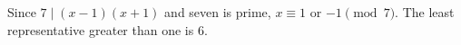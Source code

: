 Since $7\mid(x-1)(x+1)$ and seven is prime, $x\equiv1$ or $-1\pmod7$. The least representative greater than one is $\boxed6$.
